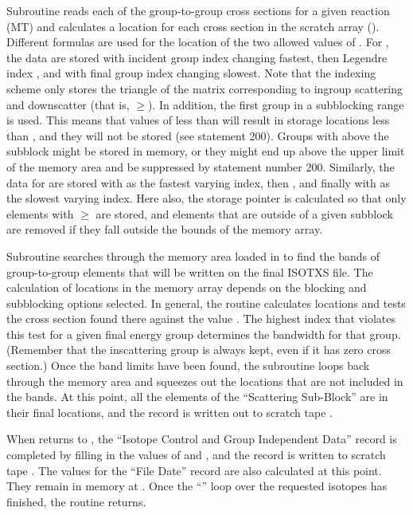 Subroutine  reads each
of the group-to-group cross sections for a given reaction (MT)
and calculates a location for each cross section in the
scratch array ().   Different formulas are used
for the location of the two allowed values of .
For , the data are stored with incident group index
 changing fastest, then Legendre index , and with
final group index  changing slowest.  Note that the indexing
scheme only stores the triangle of the matrix corresponding to ingroup
scattering and downscatter (that is, $\ge$).  In
addition, the first group in a subblocking range  is used.
This means that values of  less than  will result
in storage locations less than , and they will not be
stored (see statement 200).  Groups with  above the subblock
might be stored in memory, or they might end up above the upper limit
of the memory area and be suppressed by statement number 200.  Similarly,
the data for  are stored with  as the fastest
varying index, then , and finally with  as the
slowest varying index.  Here also, the storage pointer 
is calculated so that only elements with $\ge$ are
stored, and elements that are outside of a given subblock are removed
if they fall outside the bounds of the memory array.

Subroutine  searches
through the memory area loaded in  to find the
bands of group-to-group elements that will be written on the
final ISOTXS file.  The calculation of locations in the memory
array depends on the blocking and subblocking options selected.
In general, the routine calculates locations  and tests the
cross section found there against the value .  The
highest index that violates this test for a given final energy group
determines the bandwidth for that group.  (Remember that the
inscattering group is always kept, even if it has zero cross section.)
Once the band limits have been found, the subroutine loops back through
the memory area and squeezes out the locations that are not included in
the bands.  At this point, all the elements of the ``Scattering Sub-Block''
are in their final locations, and the record is written out to
scratch tape .

When  returns to , the ``Isotope
Control and Group Independent Data'' record is completed by filling
in the values of  and , and the record is
written to scratch tape .  The  values for
the ``File Date'' record are also calculated at this point.  They
remain in memory at .  Once the ``'' loop
over the requested isotopes has finished, the  routine
returns.

